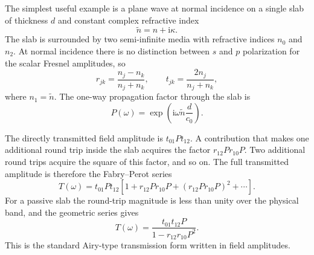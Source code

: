 \documentclass[11pt]{article}
\newcommand{\nt}{\tilde{n}}
\newcommand{\ii}{\mathrm{i}}
\newcommand{\clight}{c_0}
\begin{document}
The simplest useful example is a plane wave at normal incidence on a single slab of thickness \(d\) and constant complex refractive index
\begin{equation}
  \nt = n+\ii\kappa .
  \label{eq:constant_complex_index}
\end{equation}
The slab is surrounded by two semi-infinite media with refractive indices \(n_0\) and \(n_2\). At normal incidence there is no distinction between \(s\) and \(p\) polarization for the scalar Fresnel amplitudes, so
\begin{equation}
  r_{jk}=\frac{n_j-n_k}{n_j+n_k},
  \qquad
  t_{jk}=\frac{2n_j}{n_j+n_k},
  \label{eq:normal_fresnel}
\end{equation}
where \(n_1=\nt\). The one-way propagation factor through the slab is
\begin{equation}
  P(\omega)=\exp\!\left(\ii\omega\nt\frac{d}{\clight}\right).
  \label{eq:single_layer_propagation}
\end{equation}

The directly transmitted field amplitude is \(t_{01}Pt_{12}\). A contribution that makes one additional round trip inside the slab acquires the factor \(r_{12}Pr_{10}P\). Two additional round trips acquire the square of this factor, and so on. The full transmitted amplitude is therefore the Fabry--Perot series
\begin{equation}
  T(\omega)
  =
  t_{01}Pt_{12}
  \left[
    1+
    r_{12}Pr_{10}P+
    \left(r_{12}Pr_{10}P\right)^2+
    \cdots
  \right].
  \label{eq:fp_transmission_series}
\end{equation}
For a passive slab the round-trip magnitude is less than unity over the physical band, and the geometric series gives
\begin{equation}
  T(\omega)
  =
  \frac{
    t_{01}t_{12}P
  }{
    1-r_{12}r_{10}P^2
  } .
  \label{eq:airy_transmission}
\end{equation}
This is the standard Airy-type transmission form written in field amplitudes.
\end{document}
